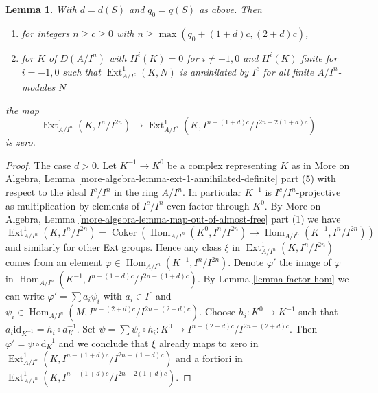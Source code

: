 \documentclass{stacks-project}
\theoremstyle{plain}
\newtheorem{lemma}[subsection]{Lemma}
\theoremstyle{definition}
\theoremstyle{remark}
\numberwithin{equation}{subsection}
\def\Hom{\mathop{\mathrm{Hom}}\nolimits}
\def\Ext{\mathop{\mathrm{Ext}}\nolimits}
\def\Coker{\mathop{\mathrm{Coker}}}
\begin{document}
\begin{lemma}
\label{lemma-bound-two-term-complex}
With $d = d(S)$ and $q_0 = q(S)$ as above. Then
\begin{enumerate}
\item for integers $n \geq c \geq 0$ with
$n \geq \max(q_0 + (1 + d)c, (2 + d)c)$,
\item for $K$ of $D(A/I^n)$ with $H^i(K) = 0$ for $i \not = -1, 0$
and $H^i(K)$ finite for $i = -1, 0$ such that $\Ext^1_{A/I^c}(K, N)$
is annihilated by $I^c$ for all finite $A/I^n$-modules $N$
\end{enumerate}
the map
$$
\Ext^1_{A/I^n}(K, I^n/I^{2n})
\longrightarrow
\Ext^1_{A/I^n}(K, I^{n - (1 + d)c}/I^{2n - 2(1 + d)c})
$$
is zero.
\end{lemma}

\begin{proof}
The case $d > 0$. Let $K^{-1} \to K^0$ be a complex representing $K$ as in
More on Algebra, Lemma \ref{more-algebra-lemma-ext-1-annihilated-definite}
part (5) with respect to the ideal $I^c/I^n$ in the ring $A/I^n$.
In particular $K^{-1}$ is $I^c/I^n$-projective as multiplication
by elements of $I^c/I^n$ even factor through $K^0$. By
More on Algebra, Lemma \ref{more-algebra-lemma-map-out-of-almost-free} part (1)
we have
$$
\Ext^1_{A/I^n}(K, I^n/I^{2n}) =
\Coker(\Hom_{A/I^n}(K^0, I^n/I^{2n}) \to \Hom_{A/I^n}(K^{-1}, I^n/I^{2n}))
$$
and similarly for other Ext groups. Hence any class $\xi$ in
$\Ext^1_{A/I^n}(K, I^n/I^{2n})$
comes from an element $\varphi \in \Hom_{A/I^n}(K^{-1}, I^n/I^{2n})$.
Denote $\varphi'$ the image of $\varphi$ in
$\Hom_{A/I^n}(K^{-1}, I^{n - (1 + d)c}/I^{2n - (1 + d)c})$.
By Lemma \ref{lemma-factor-hom}
we can write $\varphi' = \sum a_i \psi_i$ with $a_i \in I^c$ and
$\psi_i \in \Hom_{A/I^n}(M, I^{n - (2 + d)c}/I^{2n - (2 + d)c})$.
Choose $h_i : K^0 \to K^{-1}$ such that
$a_i \text{id}_{K^{-1}} = h_i \circ d_K^{-1}$. Set
$\psi = \sum \psi_i \circ h_i : K^0 \to I^{n - (2 + d)c}/I^{2n - (2 + d)c}$.
Then $\varphi' = \psi \circ \text{d}_K^{-1}$ and we conclude that
$\xi$ already maps to zero in
$\Ext^1_{A/I^n}(K, I^{n - (1 + d)c}/I^{2n - (1 + d)c})$
and a fortiori in
$\Ext^1_{A/I^n}(K, I^{n - (1 + d)c}/I^{2n - 2(1 + d)c})$.


\end{proof}
\end{document}
